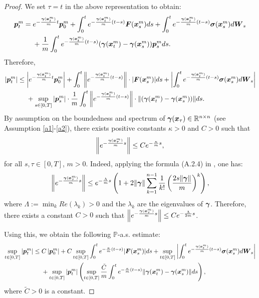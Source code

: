 \begin{proof}
We set $\tau = t$ in the above representation to obtain:
\begin{align}
\boldsymbol{p}_t^m &= e^{-\frac{\boldsymbol{\gamma}(\boldsymbol{x}_t^m)}{m}t} \boldsymbol{p}_0^m + \int_0^t e^{-\frac{\boldsymbol{\gamma}(\boldsymbol{x}_t^m)}{m}(t-s)} \boldsymbol{F}(\boldsymbol{x}_s^m) ds + \int_0^t e^{-\frac{\boldsymbol{\gamma}(\boldsymbol{x}_t^m)}{m}(t-s)} \boldsymbol{\sigma}(\boldsymbol{x}_s^m) d\boldsymbol{W}_s \nonumber \\
&\ \ \ \  + \frac{1}{m} \int_0^t e^{-\frac{\boldsymbol{\gamma}(\boldsymbol{x}_t^m)}{m}(t-s)} (\boldsymbol{\gamma}(\boldsymbol{x}_t^m)-\boldsymbol{\gamma}(\boldsymbol{x}_s^m)) \boldsymbol{p}_s^m ds.    
\end{align}
Therefore, 
\begin{align}
|\boldsymbol{p}_t^m| &\leq \left|e^{-\frac{\boldsymbol{\gamma}(\boldsymbol{x}_t^m)}{m}t} \boldsymbol{p}_0^m\right| + \int_0^t \left\|e^{-\frac{\boldsymbol{\gamma}(\boldsymbol{x}_t^m)}{m}(t-s)}\right\| \cdot |\boldsymbol{F}(\boldsymbol{x}_s^m)| ds + \left| \int_0^t e^{-\frac{\boldsymbol{\gamma}(\boldsymbol{x}_t^m)}{m}(t-s)} \boldsymbol{\sigma}(\boldsymbol{x}_s^m) d\boldsymbol{W}_s \right| \nonumber \\
&\ \ \ \  + \sup_{s \in [0,T]} |\boldsymbol{p}_s^m| \cdot \frac{1}{m} \int_0^t \left\| e^{-\frac{\boldsymbol{\gamma}(\boldsymbol{x}_t^m)}{m}(t-s)} \right\| \cdot \|(\boldsymbol{\gamma}(\boldsymbol{x}_t^m)-\boldsymbol{\gamma}(\boldsymbol{x}_s^m)) \|  ds.    
\end{align}
By assumption on the boundedness and spectrum of $\boldsymbol{\gamma}(\boldsymbol{x}_\tau) \in \mathbb{R}^{n \times n}$ (see Assumption \ref{a1}-\ref{a2}), there exists positive constants $\kappa>0$ and $C>0$ such that
\begin{equation}
\left\|e^{-\frac{\boldsymbol{\gamma}(\boldsymbol{x}^m_\tau)}{m}s}\right\| \leq C e^{-\frac{\kappa}{m}s},
\end{equation}
for all $s, \tau \in [0,T]$, $m>0$. Indeed, applying the formula (A.2.4) in \cite{kabanov2013two}, one has:
\begin{equation}
\left\|e^{-\frac{\boldsymbol{\gamma}(\boldsymbol{x}^m_\tau)}{m}s}\right\| \leq e^{-\frac{\Lambda}{m}s} \left(1 + 2 \|\boldsymbol{\gamma}\| \sum_{k=1}^{n-1} \frac{1}{k!} \left(\frac{2 s \|\boldsymbol{\gamma}\|}{m}\right)^k \right),
\end{equation}
where $\Lambda := \min_k Re(\lambda_k) > 0$ and the $\lambda_k$ are the eigenvalues of $\boldsymbol{\gamma}$. 
Therefore, there exists a constant $C>0$ such that $\left\|e^{-\frac{\boldsymbol{\gamma}(\boldsymbol{x}^m_\tau)}{m}s}\right\| \leq C e^{-\frac{\Lambda}{2m}s}$. 

Using this, we obtain the following $\mathbb{P}$-a.s. estimate:
\begin{align}
\sup_{t \in [0,T]} |\boldsymbol{p}_t^m| &\leq C  \left| \boldsymbol{p}_0^m\right| + C  \sup_{t \in [0,T]} \int_0^t  e^{-\frac{\kappa}{m}(t-s)} |\boldsymbol{F}(\boldsymbol{x}_s^m)| ds + \sup_{t \in [0,T]} \left| \int_0^t e^{-\frac{\boldsymbol{\gamma}(\boldsymbol{x}_t^m)}{m}(t-s)} \boldsymbol{\sigma}(\boldsymbol{x}_s^m) d\boldsymbol{W}_s \right| \nonumber \\
&\ \ \ \  + \sup_{t \in [0,T]} |\boldsymbol{p}_t^m| \left( \sup_{t \in [0,T]} \frac{\tilde{C}}{m} \int_0^t  e^{-\frac{\kappa}{m}(t-s)} \|\boldsymbol{\gamma}(\boldsymbol{x}_t^m)-\boldsymbol{\gamma}(\boldsymbol{x}_s^m) \|  ds \right),    \label{as_bound}
\end{align}
where $\tilde{C}>0$ is a constant. 


\end{proof}
